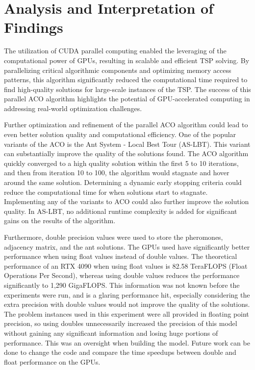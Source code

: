 \documentclass[11pt]{report}
\begin{document}
    \section{Analysis and Interpretation of Findings}
        The utilization of CUDA parallel computing enabled the leveraging of the computational power of GPUs, resulting in scalable and efficient TSP solving. By parallelizing critical algorithmic components and optimizing memory access patterns, this algorithm significantly reduced the computational time required to find high-quality solutions for large-scale instances of the TSP. The success of this parallel ACO algorithm highlights the potential of GPU-accelerated computing in addressing real-world optimization challenges.
        
        Further optimization and refinement of the parallel ACO algorithm could lead to even better solution quality and computational efficiency. One of the popular variants of the ACO is the Ant System - Local Best Tour (AS-LBT). This variant can substantially improve the quality of the solutions found\cite{White03}. The ACO algorithm quickly converged to a high quality solution within the first 5 to 10 iterations, and then from iteration 10 to 100, the algorithm would stagnate and hover around the same solution. Determining a dynamic early stopping criteria could reduce the computational time for when solutions start to stagnate. Implementing any of the variants to ACO could also further improve the solution quality. In AS-LBT, no additional runtime complexity is added for significant gains on the results of the algorithm\cite{White03}.
        
        Furthermore, double precision values were used to store the pheromones, adjacency matrix, and the ant solutions. The GPUs used have significantly better performance when using float values instead of double values. The theoretical performance of an RTX 4090 when using float values is 82.58 TeraFLOPS (Float Operations Per Second), whereas using double values reduces the performance significantly to 1,290 GigaFLOPS. This information was not known before the experiments were run, and is a glaring performance hit, especially considering the extra precision with double values would not improve the quality of the solutions. The problem instances used in this experiment were all provided in floating point precision, so using doubles unnecessarily increased the precision of this model without gaining any significant information and losing huge portions of performance. This was an oversight when building the model. Future work can be done to change the code and compare the time speedups between double and float performance on the GPUs.
        
\end{document}
